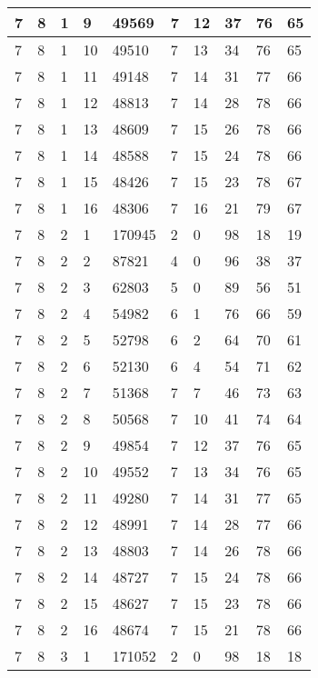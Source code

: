 \begin{table}[!ht]
\begin{tabular}{|l|l|l|l|l|l|l|l|l|l|}
        7 & 8 & 1 & 9 & 49569 & 7 & 12 & 37 & 76 & 65 \\ \hline
        7 & 8 & 1 & 10 & 49510 & 7 & 13 & 34 & 76 & 65 \\ \hline
        7 & 8 & 1 & 11 & 49148 & 7 & 14 & 31 & 77 & 66 \\ \hline
        7 & 8 & 1 & 12 & 48813 & 7 & 14 & 28 & 78 & 66 \\ \hline
        7 & 8 & 1 & 13 & 48609 & 7 & 15 & 26 & 78 & 66 \\ \hline
        7 & 8 & 1 & 14 & 48588 & 7 & 15 & 24 & 78 & 66 \\ \hline
        7 & 8 & 1 & 15 & 48426 & 7 & 15 & 23 & 78 & 67 \\ \hline
        7 & 8 & 1 & 16 & 48306 & 7 & 16 & 21 & 79 & 67 \\ \hline
        7 & 8 & 2 & 1 & 170945 & 2 & 0 & 98 & 18 & 19 \\ \hline
        7 & 8 & 2 & 2 & 87821 & 4 & 0 & 96 & 38 & 37 \\ \hline
        7 & 8 & 2 & 3 & 62803 & 5 & 0 & 89 & 56 & 51 \\ \hline
        7 & 8 & 2 & 4 & 54982 & 6 & 1 & 76 & 66 & 59 \\ \hline
        7 & 8 & 2 & 5 & 52798 & 6 & 2 & 64 & 70 & 61 \\ \hline
        7 & 8 & 2 & 6 & 52130 & 6 & 4 & 54 & 71 & 62 \\ \hline
        7 & 8 & 2 & 7 & 51368 & 7 & 7 & 46 & 73 & 63 \\ \hline
        7 & 8 & 2 & 8 & 50568 & 7 & 10 & 41 & 74 & 64 \\ \hline
        7 & 8 & 2 & 9 & 49854 & 7 & 12 & 37 & 76 & 65 \\ \hline
        7 & 8 & 2 & 10 & 49552 & 7 & 13 & 34 & 76 & 65 \\ \hline
        7 & 8 & 2 & 11 & 49280 & 7 & 14 & 31 & 77 & 65 \\ \hline
        7 & 8 & 2 & 12 & 48991 & 7 & 14 & 28 & 77 & 66 \\ \hline
        7 & 8 & 2 & 13 & 48803 & 7 & 14 & 26 & 78 & 66 \\ \hline
        7 & 8 & 2 & 14 & 48727 & 7 & 15 & 24 & 78 & 66 \\ \hline
        7 & 8 & 2 & 15 & 48627 & 7 & 15 & 23 & 78 & 66 \\ \hline
        7 & 8 & 2 & 16 & 48674 & 7 & 15 & 21 & 78 & 66 \\ \hline
        7 & 8 & 3 & 1 & 171052 & 2 & 0 & 98 & 18 & 18 \\ \hline

\end{tabular}
\end{table}
